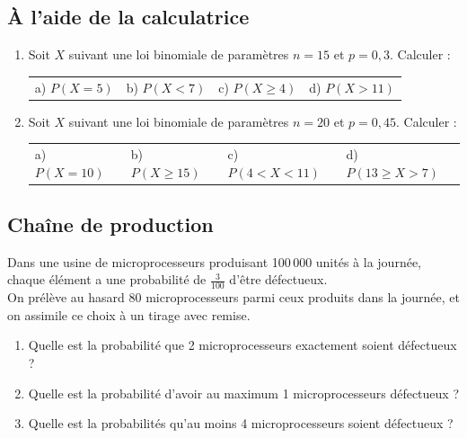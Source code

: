\documentclass[oneside,12pt]{book}          %
\begin{document}
\subsection{À l'aide de la calculatrice}
\begin{enumerate}
    \item[\faCalculator] Soit $X$ suivant une loi binomiale de paramètres $n=15$ et $p=0,3$. Calculer :\\
    \begin{tabular}{p{} p{} p{} p{}}
        a) $P(X=5)$ & b) $P(X<7)$ & c) $P(X\geq4)$ & d) $P(X>11)$ 
    \end{tabular}
    \item[\faCalculator] Soit $X$ suivant une loi binomiale de paramètres $n=20$ et $p=0,45$. Calculer :\\    
    \begin{tabular}{p{} p{} p{} p{}}
        a) $P(X=10)$ & b) $P(X\geq15)$ & c) $P(4<X<11)$ & d) $P(13\geq X>7)$ 
    \end{tabular}
\end{enumerate}



\subsection{Chaîne de production}
Dans une usine de microprocesseurs produisant 100\,000 unités à la journée, chaque élément a une probabilité de $\frac{3}{100}$  d'être défectueux. \\
On prélève au hasard 80 microprocesseurs parmi ceux produits dans la journée, et on assimile ce choix à un tirage avec remise.
\begin{enumerate}
    \item Quelle est la probabilité que 2 microprocesseurs exactement soient défectueux ?
    \item Quelle est la probabilité d'avoir au maximum 1 microprocesseurs défectueux ?
    \item Quelle est la probabilités qu'au moins 4 microprocesseurs soient défectueux ?
\end{enumerate}
\end{document}

